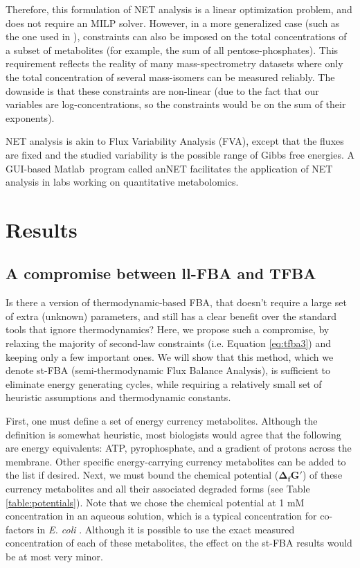\documentclass[twocolumn]{bmcart}%
\begin{document}
Therefore, this formulation of NET analysis is a linear optimization problem, and does not require an MILP solver. However, in a more generalized case (such as the one used in \cite{Kummel2006-px}), constraints can also be imposed on the total concentrations of a subset of metabolites (for example, the sum of all pentose-phosphates). This requirement reflects the reality of many mass-spectrometry datasets where only the total concentration of several mass-isomers can be measured reliably. The downside is that these constraints are non-linear (due to the fact that our variables are log-concentrations, so the constraints would be on the sum of their exponents). 

NET analysis is akin to Flux Variability Analysis (FVA), except that the fluxes are fixed and the studied variability is the possible range of Gibbs free energies. A GUI-based Matlab\texttrademark~program called anNET \cite{Zamboni2008} facilitates the application of NET analysis in labs working on quantitative metabolomics.

\section*{Results}

\subsection*{A compromise between ll-FBA and TFBA}
Is there a version of thermodynamic-based FBA, that doesn't require a large set of extra (unknown) parameters, and still has a clear benefit over the standard tools that ignore thermodynamics? Here, we propose such a compromise, by relaxing the majority of second-law constraints (i.e. Equation \ref{eq:tfba3}) and keeping only a few important ones. We will show that this method, which we denote st-FBA (semi-thermodynamic Flux Balance Analysis), is sufficient to eliminate energy generating cycles, while requiring a relatively small set of heuristic assumptions and thermodynamic constants.

First, one must define a set of energy currency metabolites. Although the definition is somewhat heuristic, most biologists would agree that the following are energy equivalents: ATP, pyrophosphate, and a gradient of protons across the membrane. Other specific energy-carrying currency metabolites can be added to the list if desired. Next, we must bound the chemical potential ($\mathbf{\Delta_f G'}$) of these currency metabolites and all their associated degraded forms (see Table \ref{table:potentials}). Note that we chose the chemical potential at 1 mM concentration in an aqueous solution, which is a typical concentration for co-factors in \emph{E. coli} \cite{Bennett2009-rm}. Although it is possible to use the exact measured concentration of each of these metabolites, the effect on the st-FBA results would be at most very minor. 
\end{document}
